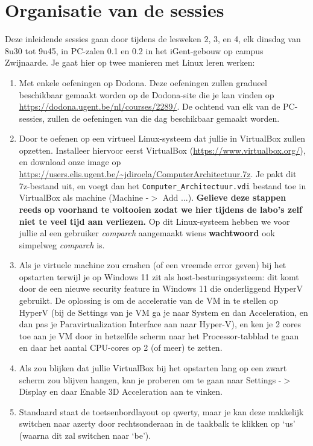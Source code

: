 \documentclass[a4paper,twoside,openany]{memoir}
\begin{document}
\section{Organisatie van de sessies}

Deze inleidende sessies gaan door tijdens de lesweken 2, 3, en 4, elk dinsdag
van 8u30 tot 9u45, in PC-zalen 0.1 en 0.2 in het iGent-gebouw op campus Zwijnaarde.
Je gaat hier op twee manieren met Linux leren werken:

\begin{enumerate}

  \item Met enkele oefeningen op Dodona. Deze oefeningen zullen gradueel
    beschikbaar gemaakt worden op de Dodona-site die je kan vinden op
    \url{https://dodona.ugent.be/nl/courses/2289/}. De ochtend van elk van de PC-sessies,
    zullen de oefeningen van die dag beschikbaar gemaakt worden.

  \item Door te oefenen op een virtueel Linux-systeem dat jullie in VirtualBox
    zullen opzetten. Installeer hiervoor eerst VirtualBox
    (\url{https://www.virtualbox.org/}), en download onze image op
    \url{https://users.elis.ugent.be/~jdiroela/ComputerArchitectuur.7z}. Je pakt dit
    7z-bestand uit, en voegt dan het \texttt{Computer\_Architectuur.vdi} bestand toe in VirtualBox als machine (Machine -$>$ Add ...).
    \textbf{Gelieve deze stappen reeds op voorhand te voltooien zodat we hier
    tijdens de labo's zelf niet te veel tijd aan verliezen.}
    Op dit Linux-systeem hebben we voor jullie al
    een gebruiker \emph{comparch} aangemaakt wiens \textbf{wachtwoord} ook
    simpelweg \emph{comparch} is.
  \item Als je virtuele machine zou crashen (of een vreemde error geven) bij het opstarten terwijl je op Windows 11 zit als host-besturingssysteem: dit komt door de een nieuwe security feature in Windows 11 die onderliggend HyperV gebruikt. De oplossing is om de acceleratie van de VM in te stellen op HyperV (bij de Settings van je VM ga je naar System en dan Acceleration, en dan pas je Paravirtualization Interface aan naar Hyper-V), en ken je 2 cores toe aan je VM door in hetzelfde scherm naar het Processor-tabblad te gaan en daar het aantal CPU-cores op 2 (of meer) te zetten.
  \item Als zou blijken dat jullie VirtualBox bij het opstarten lang op een zwart scherm zou blijven hangen, kan je proberen om te gaan naar Settings -$>$ Display en daar Enable 3D Acceleration aan te vinken.
  \item Standaard staat de toetsenbordlayout op qwerty, maar je kan deze makkelijk switchen naar azerty door rechtsonderaan in de taakbalk te klikken op `us' (waarna dit zal switchen naar `be').

\end{enumerate}
\end{document}
